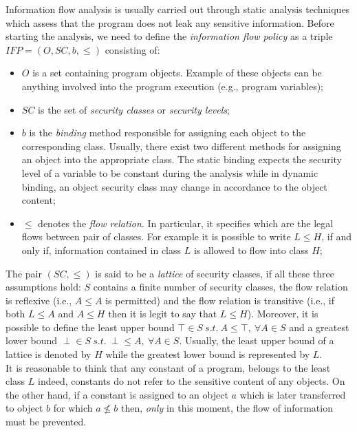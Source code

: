 \documentclass[LaM,binding=0.6cm]{sapthesis}
\begin{document}
Information flow analysis is usually carried out through static analysis techniques which assess that the program does not leak any sensitive information\cite{smith2007principles}. Before starting the analysis, we need to define the \textit{information flow policy} as a triple $IFP = (O, SC, b, \leq)$ consisting of\cite{denning1977certification}:
\begin{itemize}
\item $O$ is a set containing program objects. Example of these objects can be anything involved into the program execution (e.g., program variables);
\item $SC$ is the set of \textit{security classes} or \textit{security levels};
\item $b$ is the \textit{binding} method responsible for assigning each object to the corresponding class. Usually, there exist two different methods for assigning an object into the appropriate class. The static binding expects the security level of a variable to be constant during the analysis while in dynamic binding, an object security class may change in accordance to the object content;
\item $\leq$ denotes the \textit{flow relation}. In particular, it specifies which are the legal flows between pair of classes. For example it is possible to write $L \leq H$, if and only if, information contained in class $L$ is allowed to flow into class $H$;
\end{itemize}
The pair $(SC, \leq)$ is said to be a \textit{lattice} of security classes, if all these three assumptions hold: $S$ contains a finite number of security classes, the flow relation is reflexive (i.e., $A \leq A$ is permitted) and the flow relation is transitive (i.e., if both $L \leq A$ and $A \leq H$ then it is legit to say that $L \leq H$). Moreover, it is possible to define the least upper bound $\top \in S \ s.t. \ A \leq \top, \ \forall A \in S$ and a greatest lower bound $\perp \in S \ s.t. \ \perp \leq A, \ \forall A \in S$. Usually, the least upper bound of a lattice is denoted by $H$ while the greatest lower bound is represented by $L$.\\
It is reasonable to think that any constant of a program, belongs to the least class $L$ indeed, constants do not refer to the sensitive content of any objects. On the other hand, if a constant is assigned to an object $a$ which is later transferred to object $b$ for which $a \nleq b$ then, \textit{only} in this moment, the flow of information must be prevented.\\
\end{document}
